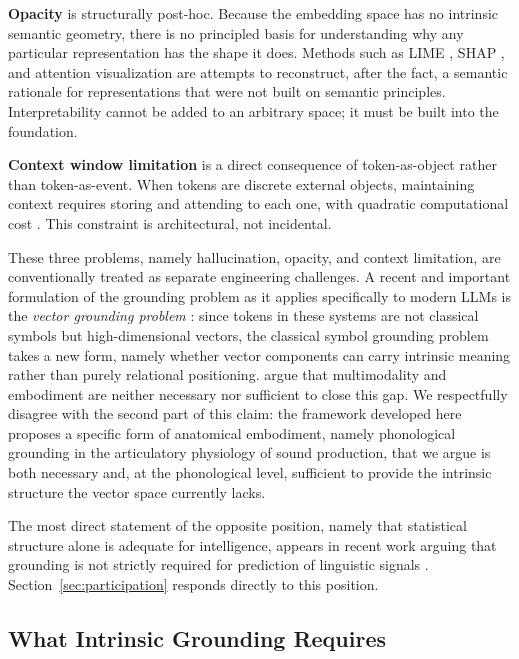 \documentclass[12pt]{article}
\begin{document}
\textbf{Opacity} is structurally post-hoc. Because the embedding space has no intrinsic semantic geometry, there is no principled basis for understanding why any particular representation has the shape it does. Methods such as LIME \citep{ribeiro2016}, SHAP \citep{lundberg2017}, and attention visualization \citep{jain2019} are attempts to reconstruct, after the fact, a semantic rationale for representations that were not built on semantic principles. Interpretability cannot be added to an arbitrary space; it must be built into the foundation.

\textbf{Context window limitation} is a direct consequence of token-as-object rather than token-as-event. When tokens are discrete external objects, maintaining context requires storing and attending to each one, with quadratic computational cost \citep{vaswani2017}. This constraint is architectural, not incidental.

These three problems, namely hallucination, opacity, and context limitation, are conventionally treated as separate engineering challenges. A recent and important formulation of the grounding problem as it applies specifically to modern LLMs is the \textit{vector grounding problem} \citep{mollo2025}: since tokens in these systems are not classical symbols but high-dimensional vectors, the classical symbol grounding problem \citep{harnad1990} takes a new form, namely whether vector components can carry intrinsic meaning rather than purely relational positioning. \citeauthor{mollo2025} argue that multimodality and embodiment are neither necessary nor sufficient to close this gap. We respectfully disagree with the second part of this claim: the framework developed here proposes a specific form of anatomical embodiment, namely phonological grounding in the articulatory physiology of sound production, that we argue is both necessary and, at the phonological level, sufficient to provide the intrinsic structure the vector space currently lacks.

The most direct statement of the opposite position, namely that statistical structure alone is adequate for intelligence, appears in recent work arguing that grounding is not strictly required for prediction of linguistic signals \citep{anon2026intelligence}. Section~\ref{sec:participation} responds directly to this position.

\subsection{What Intrinsic Grounding Requires}
\end{document}
